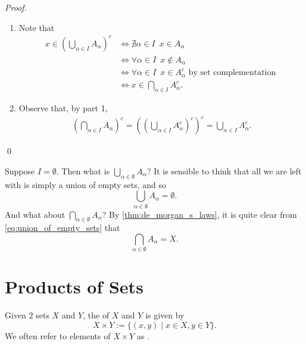 \documentclass[notoc,notitlepage]{tufte-book}
\begin{document}
\begin{proof}
  \begin{enumerate}
    \item Note that
      \begin{align*}
        x \in \left( \bigcup_{\alpha \in I} A_\alpha \right)^c &\iff \nexists \alpha \in I \enspace x \in A_\alpha \\
        &\iff \forall \alpha \in I \enspace x \notin A_\alpha \\
        &\iff \forall \alpha \in I \enspace x \in A_\alpha^c \text{ by set complementation } \\
        &\iff x \in \bigcap_{\alpha \in I} A_\alpha^c.
      \end{align*}

    \item Observe that, by part 1,
      \begin{align*}
        \left( \bigcap_{\alpha \in I} A_\alpha \right)^c = \left( \left( \bigcup_{\alpha \in I} A_{\alpha}^c \right)^c \right)^c = \bigcup_{\alpha \in I} A_\alpha^c.
      \end{align*}
  \end{enumerate}\qed
\end{proof}

\begin{eg}
  Suppose $I = \emptyset$. Then what is $\bigcup\limits_{\alpha \in \emptyset} A_\alpha$? It is sensible to think that all we are left with is simply a union of empty sets, and so
  \begin{equation}\label{eq:union_of_empty_sets}
    \bigcup_{\alpha \in \emptyset} A_\alpha = \emptyset.
  \end{equation}
  And what about $\bigcap\limits_{\alpha \in \emptyset} A_\alpha$? By \cref{thm:de_morgan_s_laws}, it is quite clear from \cref{eq:union_of_empty_sets} that
  \begin{equation*}
    \bigcap_{\alpha \in \emptyset} A_\alpha = X.
  \end{equation*}
\end{eg}


\section{Products of Sets}%
\label{sec:products_of_sets}

\begin{defn}
\label{defn:product_of_sets}
  Given $2$ sets $X$ and $Y$, the  of $X$ and $Y$ is given by
  \begin{equation*}
    X \times Y := \{ (x, y) \mid x \in X , y \in Y \}.
  \end{equation*}
  We often refer to elements of $X \times Y$ as .
\end{defn}
\end{document}
